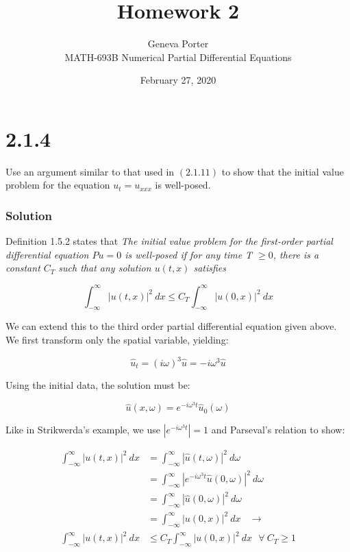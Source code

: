 \documentclass[12pt]{article}
\title{Homework 2}
\author{Geneva Porter\\ 
MATH-693B Numerical Partial Differential Equations\\}
\date{February 27, 2020}
\begin{document}
\maketitle

\section*{2.1.4}
Use an argument similar to that used in $(2.1 .11)$ to show that the initial value problem for the equation $u_{t}=u_{x x x}$ is well-posed.

\subsubsection*{Solution}

Definition 1.5.2 states that \textit{The initial value problem for the first-order partial differential equation $Pu=0$ is well-posed if for any time T $\geq 0$, there is a constant $C_T$ such that any solution $u(t,x)$ satisfies}

$$ \int_{-\infty}^\infty |u(t,x)|^2~dx \leq C_T\int_{-\infty}^\infty |u(0,x)|^2~dx $$

\noindent We can extend this to the third order partial differential equation given above. We first transform only the spatial variable, yielding:

$$ \hat{u}_t = (i\omega)^3\hat{u} = -i\omega^3\hat{u}$$

\noindent Using the initial data, the solution must be:

$$ \hat{u}(x,\omega) = e^{-i\omega^3t}\hat{u}_0(\omega) $$

\noindent Like in Strikwerda's example, we use $|e^{-i\omega^3t}|=1$ and Parseval's relation to show:

\begin{equation*}
    \begin{aligned}
    \int_{-\infty}^\infty |u(t,x)|^2~dx & = \int_{-\infty}^\infty |\hat{u}(t,\omega)|^2~d\omega \\
    ~ &= \int_{-\infty}^\infty |e^{-i\omega^3t}\hat{u}(0, \omega)|^2~d\omega \\
    ~ &= \int_{-\infty}^\infty |\hat{u}(0, \omega)|^2~d\omega \\
    ~ &= \int_{-\infty}^\infty |u(0, x)|^2~dx ~~~~ \longrightarrow \\
    \int_{-\infty}^\infty |u(t,x)|^2~dx & \leq C_T\int_{-\infty}^\infty |u(0,x)|^2~dx ~~~ \forall ~C_T \geq 1
    \end{aligned}
\end{equation*}
\end{document}
